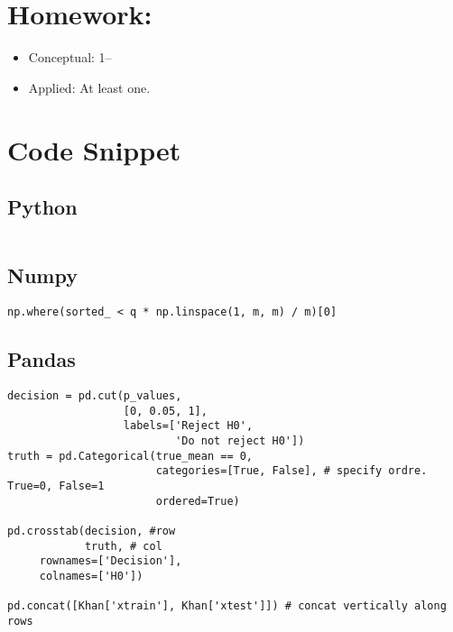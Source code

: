 \documentclass[
  letterpaper,
  DIV=11,
  numbers=noendperiod]{scrreprt}
\providecommand{\tightlist}{%
  \setlength{\itemsep}{0pt}\setlength{\parskip}{0pt}}\usepackage{longtable,booktabs,array}
\begin{document}
{{\section{Homework:}\label{homework-9}

\begin{itemize}
\tightlist
\item
  Conceptual: 1--
\item
  Applied: At least one.
\end{itemize}

\section{Code Snippet}\label{code-snippet-7}

\subsection{Python}\label{python-11}

\begin{verbatim}

\end{verbatim}

\subsection{Numpy}\label{numpy-11}

\begin{verbatim}
np.where(sorted_ < q * np.linspace(1, m, m) / m)[0]
\end{verbatim}

\subsection{Pandas}\label{pandas-11}

\begin{verbatim}
decision = pd.cut(p_values,
                  [0, 0.05, 1],
                  labels=['Reject H0',
                          'Do not reject H0'])
truth = pd.Categorical(true_mean == 0,
                       categories=[True, False], # specify ordre. True=0, False=1
                       ordered=True)
                       
pd.crosstab(decision, #row
            truth, # col
     rownames=['Decision'],
     colnames=['H0'])    
     
pd.concat([Khan['xtrain'], Khan['xtest']]) # concat vertically along rows
\end{verbatim}

}}
\end{document}
